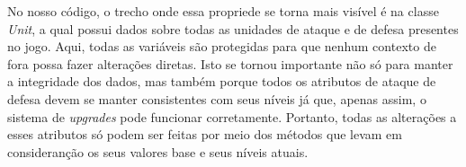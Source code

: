 \documentclass[rel_mlp]{iiufrgs}
\begin{document}
 	No nosso código, o trecho onde essa propriede se torna mais visível é na classe \textit{Unit}, a qual possui dados sobre todas as unidades de ataque e de defesa presentes no jogo. Aqui, todas as variáveis são protegidas para que nenhum contexto de fora possa fazer alterações diretas. Isto se tornou importante não só para manter a integridade dos dados, mas também porque todos os atributos de ataque de defesa devem se manter consistentes com seus níveis já que, apenas assim, o sistema de \textit{upgrades} pode funcionar corretamente. Portanto, todas as alterações a esses atributos só podem ser feitas por meio dos métodos que levam em consideranção os seus valores base e seus níveis atuais.
 
 
 
 
 
 
 
 
 
 

%

%

\end{document}
